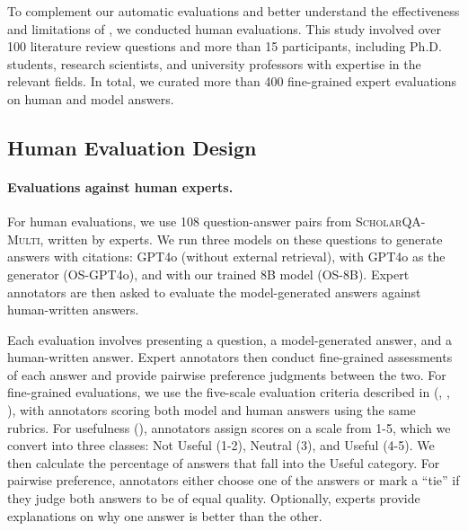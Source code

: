 \label{sec:human_eval}
To complement our automatic evaluations and better understand the effectiveness and limitations of \model, we conducted human evaluations. This study involved over 100 literature review questions and more than 15 participants, including Ph.D. students, research scientists, and university professors with expertise in the relevant fields. In total, we curated more than 400 fine-grained expert evaluations on human and model answers. 


\subsection{Human Evaluation Design}
\paragraph{Evaluations against human experts.}
For human evaluations, we use 108 question-answer pairs from \textsc{ScholarQA-Multi}, written by experts. 
We run three models on these questions to generate answers with citations: GPT4o (without external retrieval), \model with GPT4o as the generator (OS-GPT4o), and \model with our trained 8B model (OS-8B). Expert annotators are then asked to evaluate the model-generated answers against human-written answers.

Each evaluation involves presenting a question, a model-generated answer, and a human-written answer. Expert annotators then conduct fine-grained assessments of each answer and provide pairwise preference judgments between the two. 
For fine-grained evaluations, we use the five-scale evaluation criteria described in  (\covh, \orgh, \relh), with annotators scoring both model and human answers using the same rubrics. 
For usefulness (\useh), annotators assign scores on a scale from 1-5, which we convert into three classes: Not Useful (1-2), Neutral (3), and Useful (4-5). We then calculate the percentage of answers that fall into the Useful category. For pairwise preference, annotators either choose one of the answers or mark a ``tie'' if they judge both answers to be of equal quality. Optionally, experts provide explanations on why one answer is better than the other.  

\fi

